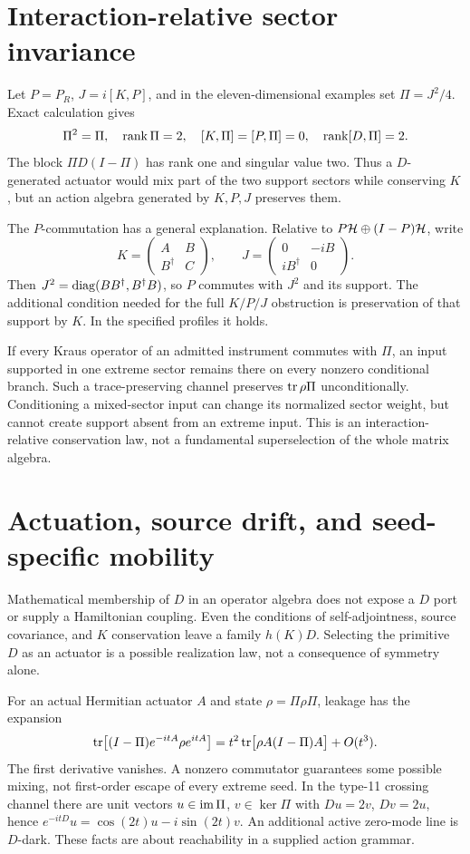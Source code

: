 \section{Interaction-relative sector invariance}\label{section:o1:interaction-relative-sector-invariance}
Let $P=P_R$, $J=i[K,P]$, and in the eleven-dimensional examples set $\Pi=J^2/4$. Exact calculation gives
\[
\Pi^2=\Pi,\quad\operatorname{rank}\Pi=2,\quad[K,\Pi]=[P,\Pi]=0,
\quad\operatorname{rank}[D,\Pi]=2.
\]
The block $\Pi D(I-\Pi)$ has rank one and singular value two. Thus a $D$-generated actuator would mix part of the two support sectors while conserving $K$, but an action algebra generated by $K,P,J$ preserves them.

The $P$-commutation has a general explanation. Relative to $P\mathcal H\oplus(I-P)\mathcal H$, write
\[
K=\begin{pmatrix}A&B\\B^\dagger&C\end{pmatrix},\qquad
J=\begin{pmatrix}0&-iB\\iB^\dagger&0\end{pmatrix}.
\]
Then $J^2=\operatorname{diag}(BB^\dagger,B^\dagger B)$, so $P$ commutes with $J^2$ and its support. The additional condition needed for the full $K/P/J$ obstruction is preservation of that support by $K$. In the specified profiles it holds.

If every Kraus operator of an admitted instrument commutes with $\Pi$, an input supported in one extreme sector remains there on every nonzero conditional branch. Such a trace-preserving channel preserves $\operatorname{tr}\rho\Pi$ unconditionally. Conditioning a mixed-sector input can change its normalized sector weight, but cannot create support absent from an extreme input. This is an interaction-relative conservation law, not a fundamental superselection of the whole matrix algebra.

\section{Actuation, source drift, and seed-specific mobility}\label{section:o1:actuation-source-drift-and-seed-specific-mobility}
Mathematical membership of $D$ in an operator algebra does not expose a $D$ port or supply a Hamiltonian coupling. Even the conditions of self-adjointness, source covariance, and $K$ conservation leave a family $h(K)D$. Selecting the primitive $D$ as an actuator is a possible realization law, not a consequence of symmetry alone.

For an actual Hermitian actuator $A$ and state $\rho=\Pi\rho\Pi$, leakage has the expansion
\[
\operatorname{tr}\bigl[(I-\Pi)e^{-itA}\rho e^{itA}\bigr]
=t^2\operatorname{tr}\bigl[\rho A(I-\Pi)A\bigr]+O(t^3).
\]
The first derivative vanishes. A nonzero commutator guarantees some possible mixing, not first-order escape of every extreme seed. In the type-11 crossing channel there are unit vectors $u\in\operatorname{im}\Pi$, $v\in\ker\Pi$ with $Du=2v$, $Dv=2u$, hence $e^{-itD}u=\cos(2t)u-i\sin(2t)v$. An additional active zero-mode line is $D$-dark. These facts are about reachability in a supplied action grammar.

